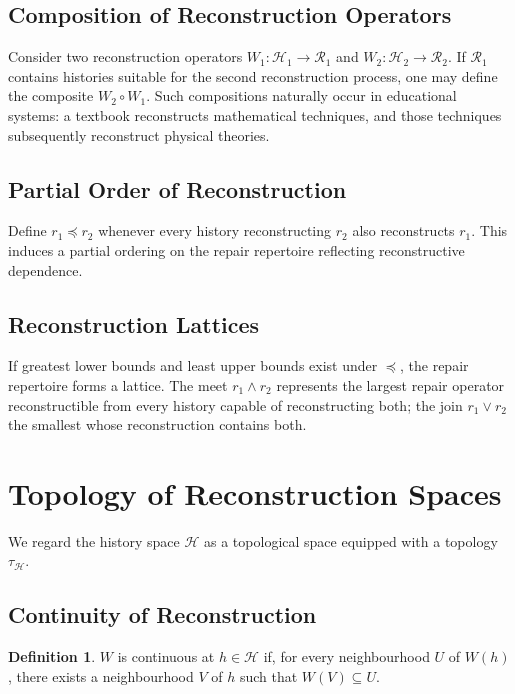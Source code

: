 \documentclass[12pt,oneside]{article}
\theoremstyle{plain}
\theoremstyle{definition}
\newtheorem{definition}[theorem]{Definition}
\theoremstyle{remark}
\theoremstyle{plain}
\newcommand{\Hist}{\mathcal{H}}
\begin{document}
\subsection{Composition of Reconstruction Operators}

Consider two reconstruction operators $W_1 : \Hist_1 \rightarrow \mathcal{R}_1$ and
$W_2 : \Hist_2 \rightarrow \mathcal{R}_2$. If $\mathcal{R}_1$ contains histories suitable for the
second reconstruction process, one may define the composite $W_2 \circ W_1$. Such compositions
naturally occur in educational systems: a textbook reconstructs mathematical techniques, and those
techniques subsequently reconstruct physical theories.

\subsection{Partial Order of Reconstruction}

Define $r_1 \preceq r_2$ whenever every history reconstructing $r_2$ also reconstructs $r_1$.
This induces a partial ordering on the repair repertoire reflecting reconstructive dependence.

\subsection{Reconstruction Lattices}

If greatest lower bounds and least upper bounds exist under $\preceq$, the repair repertoire forms
a lattice. The meet $r_1 \wedge r_2$ represents the largest repair operator reconstructible from
every history capable of reconstructing both; the join $r_1 \vee r_2$ the smallest whose
reconstruction contains both.

\section{Topology of Reconstruction Spaces}

We regard the history space $\Hist$ as a topological space equipped with a topology $\tau_\Hist$.

\subsection{Continuity of Reconstruction}

\begin{definition}
$W$ is continuous at $h \in \Hist$ if, for every neighbourhood $U$ of $W(h)$, there exists a
neighbourhood $V$ of $h$ such that $W(V) \subseteq U$.
\end{definition}
\end{document}
